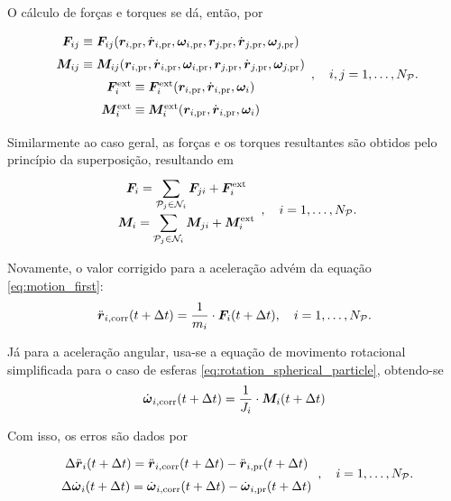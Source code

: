O cálculo de forças e torques se dá, então, por
\begin{equation*}
	\def\arraystretch{1.5}
	\begin{array}{c}
		\forceij \equiv \forceij\pqty{\positionipr, \velocityipr, \angularVelocityipr, \positionjpr, \velocityjpr, \angularVelocityjpr} \\
		\torqueij \equiv \torqueij\pqty{\positionipr, \velocityipr, \angularVelocityipr, \positionjpr, \velocityjpr, \angularVelocityjpr} \\
		\external\forcei \equiv \external\forcei\pqty{\positionipr, \velocityipr, \angularVelocityi} \\
		\external\torquei \equiv \external\torquei\pqty{\positionipr, \velocityipr, \angularVelocityi}
	\end{array}, \quad i,j = 1, \dots, \numberOfParticles.
\end{equation*}

Similarmente ao caso geral, as forças e os torques resultantes são obtidos pelo princípio da superposição, resultando em
\begin{equation*}
	\def\arraystretch{1.5}
	\begin{array}{c}
		\resultingForcei = \dsum_{\particlej\in\ineighborhood{i}}\forceji + \external\forcei\\
		\resultingTorquei = \dsum_{\particlej\in\ineighborhood{i}}\torqueji + \external\torquei
	\end{array}, \quad i = 1, \dots, \numberOfParticles.
\end{equation*}

Novamente, o valor corrigido para a aceleração advém da equação \eqref{eq:motion_first}:
\begin{equation*}
	\accelerationicorr\pqty{t+\Dt} = \dfrac{1}{\massi}\cdot\resultingForcei\pqty{t+\Dt}, \quad i = 1, \dots, \numberOfParticles.
\end{equation*}

Já para a aceleração angular, usa-se a equação de movimento rotacional simplificada para o caso de esferas \eqref{eq:rotation_spherical_particle}, obtendo-se
\begin{equation*}
	\dangularVelocityicorr{1}\pqty{t+\Dt} = \dfrac{1}{\momentOfInertiai}\cdot\resultingTorquei\pqty{t+\Dt}
\end{equation*}

Com isso, os erros são dados por
\begin{equation*}
	\def\arraystretch{1.5}
	\begin{array}{c}
		\Delta \accelerationi\pqty{t+\Dt} = \accelerationicorr\pqty{t+\Dt} - \accelerationipr\pqty{t+\Dt} \\
		\Delta \dangularVelocityi{1}\pqty{t+\Dt} = \dangularVelocityicorr{1}\pqty{t+\Dt} - \dangularVelocityipr{1}\pqty{t+\Dt} \\
	\end{array}, \quad i = 1, \dots, \numberOfParticles.
\end{equation*}

